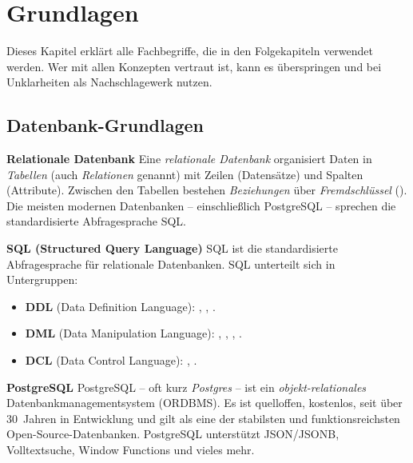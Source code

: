 
\chapter{Grundlagen}

\label{ch:grundlagen}

Dieses Kapitel erklärt alle Fachbegriffe, die in den Folgekapiteln
verwendet werden. Wer mit allen Konzepten vertraut ist, kann es
überspringen und bei Unklarheiten als Nachschlagewerk nutzen.

\section{Datenbank-Grundlagen}

\begin{definition}
\textbf{Relationale Datenbank}
Eine \emph{relationale Datenbank} organisiert Daten in
\emph{Tabellen} (auch \emph{Relationen} genannt) mit Zeilen (Datensätze)
und Spalten (Attribute). Zwischen den Tabellen bestehen
\emph{Beziehungen} über \emph{Fremdschlüssel} ().
Die meisten modernen Datenbanken -- einschließlich PostgreSQL --
sprechen die standardisierte Abfragesprache SQL.
\end{definition}

\begin{definition}
\textbf{SQL (Structured Query Language)}
SQL ist die standardisierte Abfragesprache für relationale Datenbanken.
SQL unterteilt sich in Untergruppen:

\begin{itemize}
  \item \textbf{DDL} (Data Definition Language): ,
        , .
  \item \textbf{DML} (Data Manipulation Language): ,
        , , .
  \item \textbf{DCL} (Data Control Language): ,
        .
\end{itemize}
\end{definition}

\begin{definition}
\textbf{PostgreSQL}
PostgreSQL -- oft kurz \emph{Postgres} -- ist ein
\emph{objekt-relationales} Datenbankmanagementsystem (ORDBMS). Es ist
quelloffen, kostenlos, seit über 30~Jahren in Entwicklung und gilt als
eine der stabilsten und funktionsreichsten Open-Source-Datenbanken.
PostgreSQL unterstützt JSON/JSONB, Volltextsuche, Window Functions und
vieles mehr.
\end{definition}

